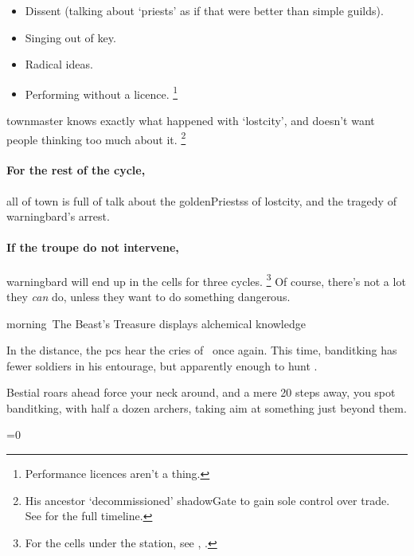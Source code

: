 \begin{itemize}
  \item
  Dissent (talking about `priests' as if that were better than simple guilds).
  \item
  Singing out of key.
  \item
  Radical ideas.
  \item
  Performing without a licence.%
  \footnote{Performance licences aren't a thing.}
\end{itemize}

\Gls{townmaster} knows exactly what happened with `\gls{lostcity}', and doesn't want people thinking too much about it.%
\footnote{His ancestor `decommissioned' \gls{shadowGate} to gain sole control over trade.
See  for the full timeline.}

\paragraph{For the rest of the \gls{cycle},}
all of \gls{town} is full of talk about the \glspl{goldenPriests} of \gls{lostcity}, and the tragedy of \gls{warningbard}'s arrest.

\paragraph{If the troupe do not intervene,}
\gls{warningbard} will end up in the cells for three \glspl{cycle}.
\footnote{For the cells under the  station, see , .}
Of course, there's not a lot they \emph{can} do, unless they want to do something dangerous.

\warningbard[\label{warningbard}]

{\gls{morning}~The Beast's Treasure}%
{ displays alchemical knowledge}%

In the distance, the \glspl{pc} hear the cries of \localMonster\ once again.
This time, \gls{banditking} has fewer soldiers in his entourage, but apparently enough to hunt \localMonster.

\begin{boxtext}
  Bestial roars ahead force your neck around, and a mere 20 \glspl{step} away, you spot \gls{banditking}, with half a dozen archers, taking aim at something just beyond them.
\end{boxtext}

\ifnum\value{temperature}=0
  \griffin
\else
  \basilisk
\fi

